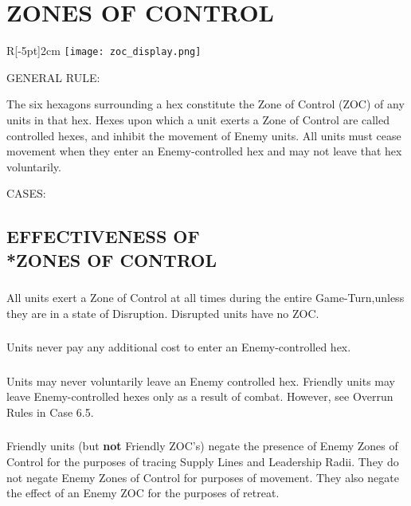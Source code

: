 \section{ZONES OF CONTROL}

\begin{wrapfigure}{R}[-5pt]{2cm}
  \raggedleft
  \texttt{[image: zoc\_display.png]}
\end{wrapfigure}

GENERAL RULE:

The six hexagons surrounding a hex constitute the Zone of Control (ZOC) of any units in that hex. Hexes upon which a unit exerts a Zone of Control are called controlled hexes, and inhibit the movement of Enemy units. All units must cease movement when they enter an Enemy-controlled hex and may not leave that hex voluntarily.

CASES:

\subsection{EFFECTIVENESS OF\\*ZONES OF CONTROL}

\subsubsection{} All units exert a Zone of Control at all times during the entire Game-Turn,unless they are in a state of Disruption. Disrupted units have no ZOC.

\subsubsection{} Units never pay any additional cost to enter an Enemy-controlled hex.

\subsubsection{} Units may never voluntarily leave an Enemy controlled hex. Friendly units may leave Enemy-controlled hexes only as a result of combat. However, see Overrun Rules in Case 6.5.

\subsubsection{} Friendly units (but \textbf{not} Friendly ZOC's) negate the presence of Enemy Zones of Control for the purposes of tracing Supply Lines and Leadership Radii. They do not negate Enemy Zones of Control for purposes of movement. They also negate the effect of an Enemy ZOC for the purposes of retreat.

